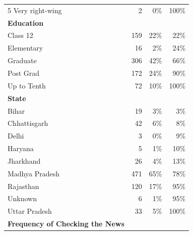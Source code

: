 \documentclass[empirical, authordate]{jote-new-article}
\begin{document}
\begin{table}
\begin{tabularx}{\linewidth}{@{} X  r  r r@{}}
    5 Very right-wing                       & 2        & 0\%               & 100\%                        \\
    \textbf{Education}                      &          &                   &                              \\
    Class 12                                & 159      & 22\%              & 22\%                         \\
    Elementary                              & 16       & 2\%               & 24\%                         \\
    Graduate                                & 306      & 42\%              & 66\%                         \\
    Post Grad                               & 172      & 24\%              & 90\%                         \\
    Up to Tenth                             & 72       & 10\%              & 100\%                        \\
    \textbf{State}                          &          &                   &                              \\
    Bihar                                   & 19       & 3\%               & 3\%                          \\
    Chhattisgarh                            & 42       & 6\%               & 8\%                          \\
    Delhi                                   & 3        & 0\%               & 9\%                          \\
    Haryana                                 & 5        & 1\%               & 10\%                         \\
    Jharkhand                               & 26       & 4\%               & 13\%                         \\
    Madhya Pradesh                          & 471      & 65\%              & 78\%                         \\
    Rajasthan                               & 120      & 17\%              & 95\%                         \\
    Unknown                                 & 6        & 1\%               & 95\%                         \\
    Uttar Pradesh                           & 33       & 5\%               & 100\%                        \\
    \textbf{Frequency of Checking the News} &          &                   &                              \\

\end{tabularx}
\end{table}
\end{document}
